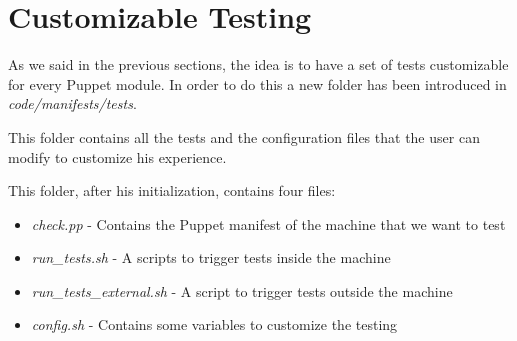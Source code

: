 \section{Customizable Testing}

As we said in the previous sections, the idea is to have a set of tests
customizable for every Puppet module. In order to do this a new folder has
been introduced in \textit{code/manifests/tests}.

This folder contains all the tests and the configuration files that the
user can modify to customize his experience.

This folder, after his initialization, contains four files:

\begin{itemize}
  \item \textit{check.pp} - Contains the Puppet manifest of the machine that we want to test
  \item \textit{run\_tests.sh} - A scripts to trigger tests inside the machine
  \item \textit{run\_tests\_external.sh} - A script to trigger tests outside the machine
  \item \textit{config.sh} - Contains some variables to customize the testing
\end{itemize}


